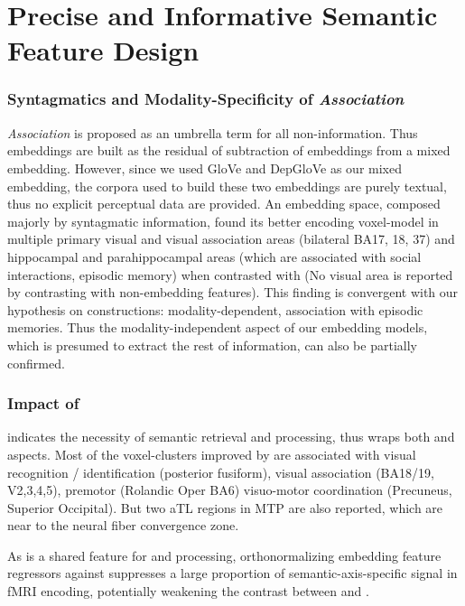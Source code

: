 \section{Precise and Informative Semantic Feature Design}

\subsubsection{Syntagmatics and Modality-Specificity of \emph{Association}}

\emph{Association} is proposed as an umbrella term for all non-\similarity information. Thus  embeddings are built as the residual of subtraction of \similarity embeddings from a mixed embedding. However, since we used GloVe and DepGloVe as our mixed embedding, the corpora used to build these two embeddings are purely textual, thus no explicit perceptual data are provided. An embedding space, composed majorly by syntagmatic information, found its better encoding voxel-model in multiple primary visual and visual association areas (bilateral BA17, 18, 37) and hippocampal and parahippocampal areas (which are associated with social interactions, episodic memory) when contrasted with \similarity (No visual area is reported by contrasting  with non-embedding features). This finding is convergent with our hypothesis on \association constructions: modality-dependent, association with episodic memories. Thus the modality-independent aspect of our \similarity embedding models, which is presumed to extract the rest of information, can also be partially confirmed.

\subsubsection{Impact of }

 indicates the necessity of semantic retrieval and processing, thus wraps both \similarity and \association aspects. Most of the voxel-clusters improved by  are associated with visual recognition / identification (posterior fusiform), visual association (BA18/19, V2,3,4,5), premotor (Rolandic Oper BA6) visuo-motor coordination (Precuneus, Superior Occipital). But two aTL regions in MTP are also reported, which are near to the neural fiber convergence zone. 

As  is a shared feature for \similarity and \association processing, orthonormalizing embedding feature regressors against  suppresses a large proportion of semantic-axis-specific signal in fMRI encoding, potentially weakening the contrast between  and .

